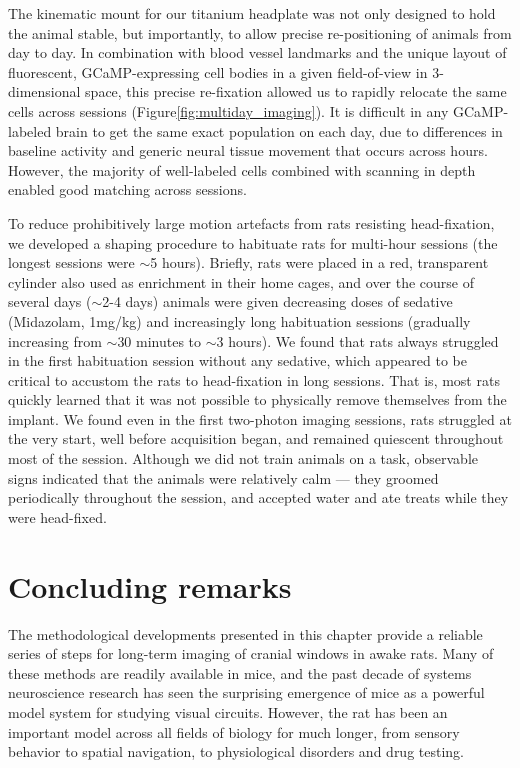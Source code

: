 The kinematic mount for our titanium headplate was not only designed to hold the animal stable, but importantly, to allow precise re-positioning of animals from day to day. In combination with blood vessel landmarks and the unique layout of fluorescent, GCaMP-expressing cell bodies in a given field-of-view in 3-dimensional space, this precise re-fixation allowed us to rapidly relocate the same cells across sessions (Figure\ref{fig:multiday_imaging}). It is difficult in any GCaMP-labeled brain to get the same exact population on each day, due to differences in baseline activity and generic neural tissue movement that occurs across hours. However, the majority of well-labeled cells combined with scanning in depth enabled good matching across sessions. 

To reduce prohibitively large motion artefacts from rats resisting head-fixation, we developed a shaping procedure to habituate rats for multi-hour sessions (the longest sessions were $\sim$5 hours). Briefly, rats were placed in a red, transparent cylinder also used as enrichment in their home cages, and over the course of several days ($\sim$2-4 days) animals were given decreasing doses of sedative (Midazolam, 1mg/kg) and increasingly long habituation sessions (gradually increasing from $\sim$30 minutes to $\sim$3 hours). We found that rats always struggled in the first habituation session without any sedative, which appeared to be critical to accustom the rats to head-fixation in long sessions. That is, most rats quickly learned that it was not possible to physically remove themselves from the implant. We found even in the first two-photon imaging sessions, rats struggled at the very start, well before acquisition began, and remained quiescent throughout most of the session. Although we did not train animals on a task, observable signs indicated that the animals were relatively calm --- they groomed periodically throughout the session, and accepted water and ate treats while they were head-fixed. 

\section{Concluding remarks}
The methodological developments presented in this chapter provide a reliable series of steps for long-term imaging of cranial windows in awake rats. Many of these methods are readily available in mice, and the past decade of systems neuroscience research has seen the surprising emergence of mice as a powerful model system for studying visual circuits. However, the rat has been an important model across all fields of biology for much longer, from sensory behavior\cite{Lashley1930} to spatial navigation\cite{OKeefe1971, Aronov2014, Eichenbaum1990}, to physiological disorders and drug testing. 

